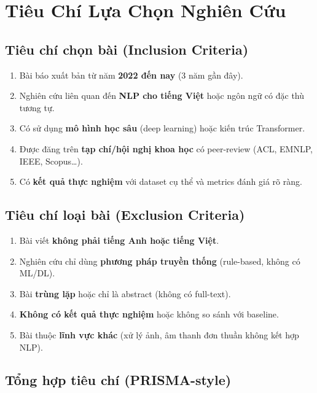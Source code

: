\documentclass[12pt, a4paper]{article}
\begin{document}
\section{Tiêu Chí Lựa Chọn Nghiên Cứu}

\subsection{Tiêu chí chọn bài (Inclusion Criteria)}

\begin{enumerate}[leftmargin=*, label=\textbf{I\arabic*.}]
    \item Bài báo xuất bản từ năm \textbf{2022 đến nay} (3 năm gần đây).
    \item Nghiên cứu liên quan đến \textbf{NLP cho tiếng Việt} hoặc ngôn ngữ có đặc thù tương tự.
    \item Có sử dụng \textbf{mô hình học sâu} (deep learning) hoặc kiến trúc Transformer.
    \item Được đăng trên \textbf{tạp chí/hội nghị khoa học} có peer-review (ACL, EMNLP, IEEE, Scopus\ldots).
    \item Có \textbf{kết quả thực nghiệm} với dataset cụ thể và metrics đánh giá rõ ràng.
\end{enumerate}

\subsection{Tiêu chí loại bài (Exclusion Criteria)}

\begin{enumerate}[leftmargin=*, label=\textbf{E\arabic*.}]
    \item Bài viết \textbf{không phải tiếng Anh hoặc tiếng Việt}.
    \item Nghiên cứu chỉ dùng \textbf{phương pháp truyền thống} (rule-based, không có ML/DL).
    \item Bài \textbf{trùng lặp} hoặc chỉ là abstract (không có full-text).
    \item \textbf{Không có kết quả thực nghiệm} hoặc không so sánh với baseline.
    \item Bài thuộc \textbf{lĩnh vực khác} (xử lý ảnh, âm thanh đơn thuần không kết hợp NLP).
\end{enumerate}

\subsection{Tổng hợp tiêu chí (PRISMA-style)}
\end{document}

